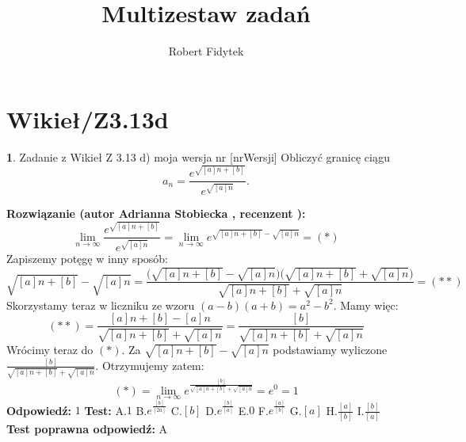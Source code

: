 \documentclass[12pt, a4paper]{article}
\title{Multizestaw zadań}
\author{Robert Fidytek}
\date{}
\theoremstyle{definition} %
\newtheorem{zad}{}
\newcommand{\kategoria}[1]{\section{#1}} %
\newcommand{\zadStart}[1]{\begin{zad}#1\newline} %
\newcommand{\zadStop}{\end{zad}}   %
\newcommand{\rozwStart}[2]{\noindent \textbf{Rozwiązanie (autor #1 , recenzent #2): }\newline} %
\newcommand{\rozwStop}{\newline}                                            %
\newcommand{\odpStart}{\noindent \textbf{Odpowiedź:}\newline}    %
\newcommand{\odpStop}{\newline}                                             %
\newcommand{\testStart}{\noindent \textbf{Test:}\newline} %
\newcommand{\testStop}{\newline} %
\newcommand{\kluczStart}{\noindent \textbf{Test poprawna odpowiedź:}\newline} %
\newcommand{\kluczStop}{\newline} %
\begin{document}
\maketitle


\kategoria{Wikieł/Z3.13d}
\zadStart{Zadanie z Wikieł Z 3.13 d) moja wersja nr [nrWersji]}
Obliczyć granicę ciągu 
$$a_n=\frac{e^{\sqrt{[a]n+[b]}}}{e^{\sqrt{[a]n}}}.$$
\zadStop
\rozwStart{Adrianna Stobiecka}{}
$$\lim_{n\to\infty}\frac{e^{\sqrt{[a]n+[b]}}}{e^{\sqrt{[a]n}}}=\lim_{n\to\infty}e^{\sqrt{[a]n+[b]}-\sqrt{[a]n}}=(*)$$
Zapiszemy potęgę w inny sposób:
$$\sqrt{[a]n+[b]}-\sqrt{[a]n}=\frac{\big(\sqrt{[a]n+[b]}-\sqrt{[a]n}\big)\big(\sqrt{[a]n+[b]}+\sqrt{[a]n}\big)}{\sqrt{[a]n+[b]}+\sqrt{[a]n}}=(**)$$
Skorzystamy teraz w liczniku ze wzoru $(a-b)(a+b)=a^2-b^2$. Mamy więc:
$$(**)=\frac{[a]n+[b]-[a]n}{\sqrt{[a]n+[b]}+\sqrt{[a]n}}=\frac{[b]}{\sqrt{[a]n+[b]}+\sqrt{[a]n}}$$
Wrócimy teraz do $(*)$. Za $\sqrt{[a]n+[b]}-\sqrt{[a]n}$ podstawiamy wyliczone $\frac{[b]}{\sqrt{[a]n+[b]}+\sqrt{[a]n}}$. Otrzymujemy zatem:
$$(*)=\lim_{n\to\infty}e^{\frac{[b]}{\sqrt{[a]n+[b]}+\sqrt{[a]n}}}=e^{0}=1$$
\rozwStop
\odpStart
$1$
\odpStop
\testStart
A.$1$
B.$e^{\frac{[b]}{[2a]}}$
C.$[b]$
D.$e^{\frac{[b]}{[a]}}$
E.$0$
F.$e^{\frac{[a]}{[b]}}$
G.$[a]$
H.$\frac{[a]}{[b]}$
I.$\frac{[b]}{[a]}$
\testStop
\kluczStart
A
\kluczStop
\end{document}
